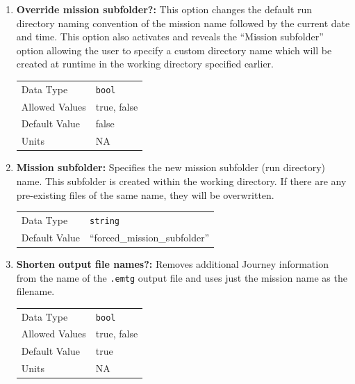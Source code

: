 \begin{enumerate}
    \item{\textbf{Override mission subfolder?:}} This option changes the default run directory naming convention of the mission name followed by the current date and time. This option also activates and reveals the ``Mission subfolder'' option allowing the user to specify a custom directory name which will be created at runtime in the working directory specified earlier.
    
        \begin{table}[H]
            \hspace{2cm}
            \begin{tabular}{ll}
            Data Type & \verb|bool| \\
            Allowed Values & true, false \\
            Default Value & false \\
            Units & NA
            \end{tabular}
        \end{table}

    \item{\textbf{Mission subfolder:}} Specifies the new mission subfolder (run directory) name. This subfolder is created within the working directory. If there are any pre-existing files of the same name, they will be overwritten.
    
        \begin{table}[H]
            \hspace{2cm}
            \begin{tabular}{ll}
            Data Type & \verb|string| \\
            Default Value & ``forced\_mission\_subfolder'' \\
            \end{tabular}
        \end{table}

    \item{\textbf{Shorten output file names?:}} Removes additional Journey information from the name of the \verb|.emtg| output file and uses just the mission name as the filename.
    
        \begin{table}[H]
            \hspace{2cm}
            \begin{tabular}{ll}
            Data Type & \verb|bool| \\
            Allowed Values & true, false \\
            Default Value & true \\
            Units & NA
            \end{tabular}
        \end{table}


\end{enumerate}
